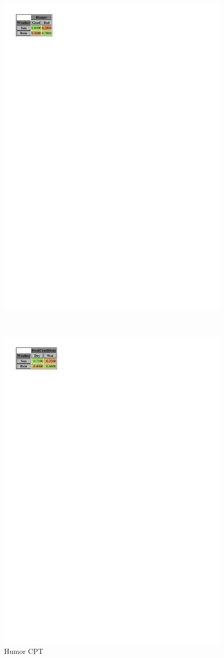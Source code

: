 \documentclass[a4paper,12pt]{article} %
\begin{document}
\begin{figure}[H]
	\centering
	\begin{minipage}[c]{.3\textwidth}
		\centering
		\includegraphics[width=.8\linewidth]{../code/humor.pdf}	
		\caption*{Humor CPT}
		\label{fig:humor}
	\end{minipage}
	~
	\begin{minipage}[c]{.3\textwidth}
		\centering
		\includegraphics[width=.9\linewidth]{../code/roadconditions.pdf}	

\end{minipage}
\end{figure}
\end{document}
